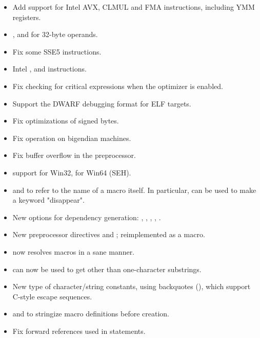 \begin{itemize}
    \item{Add support for Intel AVX, CLMUL and FMA instructions,
        including YMM registers.}
    \item{,  and  for 32-byte operands.}
    \item{Fix some SSE5 instructions.}
    \item{Intel ,  and  instructions.}
    \item{Fix checking for critical expressions when the optimizer is enabled.}
    \item{Support the DWARF debugging format for ELF targets.}
    \item{Fix optimizations of signed bytes.}
    \item{Fix operation on bigendian machines.}
    \item{Fix buffer overflow in the preprocessor.}
    \item{ support for Win32,  for Win64 (SEH).}
    \item{ and  to refer to the name of a macro itself.
        In particular,  can be used to make
        a keyword "disappear".}
    \item{New options for dependency generation: , ,
        , , .}
    \item{New preprocessor directives  and ;
         reimplemented as a macro.}
    \item{ now resolves macros in a sane manner.}
    \item{ can now be used to get other than one-character substrings.}
    \item{New type of character/string constants, using backquotes (),
        which support C-style escape sequences.}
    \item{ and  to stringize macro definitions
        before creation.}
    \item{Fix forward references used in  statements.}
\end{itemize}


